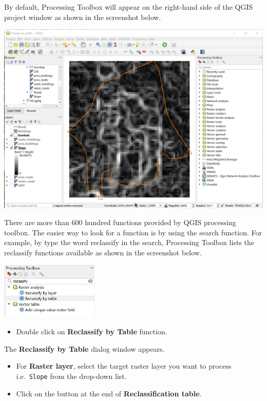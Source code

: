\documentclass[
  letterpaper,
  DIV=11,
  numbers=noendperiod]{scrreprt}
\providecommand{\tightlist}{%
  \setlength{\itemsep}{0pt}\setlength{\parskip}{0pt}}\usepackage{longtable,booktabs,array}
\begin{document}
By default, Processing Toolbox will appear on the right-hand side of the
QGIS project window as shown in the screenshot below.

\includegraphics{./img07/image30.jpg}

There are more than 600 hundred functions provided by QGIS processing
toolbox. The easier way to look for a function is by using the search
function. For example, by type the word reclassify in the search,
Processing Toolbox lists the reclassify functions available as shown in
the screenshot below.

\includegraphics[width=0.35\textwidth,height=\textheight]{./img07/image31.jpg}

\begin{itemize}
\tightlist
\item
  Double click on \textbf{Reclassify by Table} function.
\end{itemize}

The \textbf{Reclassify by Table} dialog window appears.

\begin{itemize}
\tightlist
\item
  For \textbf{Raster layer}, select the target raster layer you want to
  process i.e.~\texttt{Slope} from the drop-down list.
\item
  Click on the button at the end of \textbf{Reclassification table}.
\end{itemize}
\end{document}
